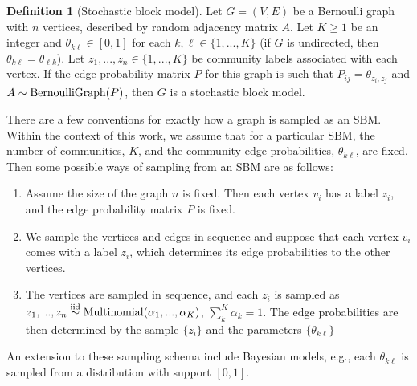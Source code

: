 \documentclass[
  11pt,
]{article}
\providecommand{\tightlist}{%
  \setlength{\itemsep}{0pt}\setlength{\parskip}{0pt}}
\theoremstyle{definition}
\newtheorem{definition}{Definition}[section]
\theoremstyle{definition}
\theoremstyle{definition}
\theoremstyle{definition}
\theoremstyle{remark}
\begin{document}
\begin{definition}[Stochastic block model]
\label{def:sbm}
Let $G = (V, E)$ be a Bernoulli graph with $n$ vertices, described by random adjacency matrix $A$. 
Let $K \geq 1$ be an integer and $\theta_{k \ell} \in [0, 1]$ for each $k, \ell \in \{1, ..., K\}$ (if $G$ is undirected, then $\theta_{k \ell} = \theta_{\ell k}$). 
Let $z_1, ..., z_n \in \{1, ..., K\}$ be community labels associated with each vertex. 
If the edge probability matrix $P$ for this graph is such that 
$P_{ij} = \theta_{z_i, z_j}$ and $A \sim \mathrm{BernoulliGraph}(P)$, then $G$ is a stochastic block model. 
\end{definition}

There are a few conventions for exactly how a graph is sampled as an SBM.
Within the context of this work, we assume that for a particular SBM, the number of communities, \(K\), and the community edge probabilities, \(\theta_{k \ell}\), are fixed.
Then some possible ways of sampling from an SBM are as follows:

\begin{enumerate}
\def\labelenumi{\arabic{enumi}.}
\tightlist
\item
  Assume the size of the graph \(n\) is fixed.
  Then each vertex \(v_i\) has a label \(z_i\), and the edge probability matrix \(P\) is fixed.
\item
  We sample the vertices and edges in sequence and suppose that each vertex \(v_i\) comes with a label \(z_i\), which determines its edge probabilities to the other vertices.
\item
  The vertices are sampled in sequence, and each \(z_i\) is sampled as \(z_1, ..., z_n \stackrel{\mathrm{iid}}{\sim} \mathrm{Multinomial}(\alpha_1, ..., \alpha_K)\), \(\sum_k^K \alpha_k = 1\). The edge probabilities are then determined by the sample \(\{z_i\}\) and the parameters \(\{\theta_{k \ell}\}\)
\end{enumerate}

An extension to these sampling schema include Bayesian models, e.g., each \(\theta_{k \ell}\) is sampled from a distribution with support \([0, 1]\).
\end{document}
